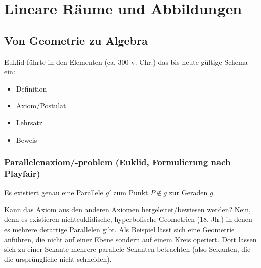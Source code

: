\chapter{Lineare Räume und Abbildungen}
\section{Von Geometrie zu Algebra}
Euklid führte in den \glqq Elementen\grqq{} (ca. 300 v. Chr.) das bis heute gültige Schema ein:
\begin{itemize}
	\item Definition
	\item Axiom/Postulat
	\item Lehrsatz
	\item Beweis
\end{itemize}

\subsection{Parallelenaxiom/-problem (Euklid, Formulierung nach Playfair)}
	Es existiert genau eine Parallele $ g' $ zum Punkt $ P \notin g $ zur Geraden $ g $.

	Kann das Axiom aus den anderen Axiomen hergeleitet/bewiesen werden? Nein, denn es existieren nichteuklidische, hyperbolische Geometrien (18. Jh.) in denen es mehrere derartige Parallelen gibt. Als Beispiel lässt sich eine Geometrie anführen, die nicht auf einer Ebene sondern auf einem Kreis operiert. Dort lassen sich zu einer Sekante mehrere parallele Sekanten betrachten (also Sekanten, die die ursprüngliche nicht schneiden).

